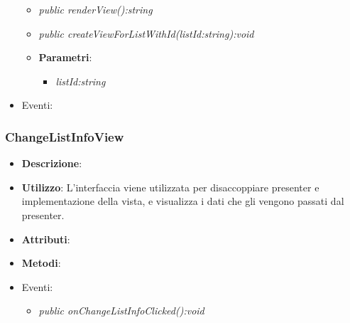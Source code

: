 \begin{itemize}
\begin{itemize}
	\item \textit{public renderView():string}\\

	\item \textit{public createViewForListWithId(listId:string):void}\\

			\item{\textbf{Parametri}: \begin{itemize}
			\item \textit{listId:string}\\

			\end{itemize}}
	\end{itemize}
\item{Eventi}:
\end{itemize}

\subsubsection{ChangeListInfoView}
\begin{itemize}
\item \textbf{Descrizione}: 
\item \textbf{Utilizzo}: L'interfaccia viene utilizzata per disaccoppiare presenter e implementazione della vista, e visualizza i dati che gli vengono passati dal presenter.
\item \textbf{Attributi}: 
\item \textbf{Metodi}:
\item{Eventi}:
	\begin{itemize}	
	\item \textit{public onChangeListInfoClicked():void}\\

	\end{itemize}
\end{itemize}

